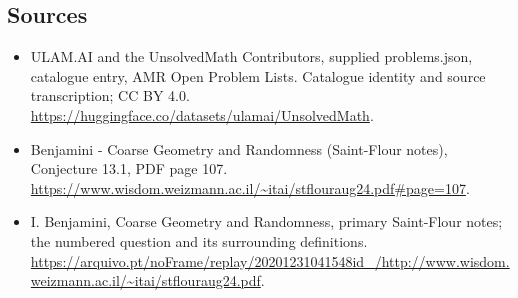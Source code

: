 \documentclass[11pt,a4paper]{article}
\begin{document}
\subsection{Sources}
\begin{itemize}
\item[S1] ULAM.AI and the UnsolvedMath Contributors, supplied problems.json, catalogue entry, AMR Open Problem Lists. Catalogue identity and source transcription; CC BY 4.0.
\url{https://huggingface.co/datasets/ulamai/UnsolvedMath}.
\item[S2] Benjamini - Coarse Geometry and Randomness (Saint-Flour notes), Conjecture 13.1, PDF page 107. 
\url{https://www.wisdom.weizmann.ac.il/~itai/stflouraug24.pdf#page=107}.
\item[S3] I. Benjamini, Coarse Geometry and Randomness, primary Saint-Flour notes; the numbered question and its surrounding definitions.
\url{https://arquivo.pt/noFrame/replay/20201231041548id_/http://www.wisdom.weizmann.ac.il/~itai/stflouraug24.pdf}.
\end{itemize}
\end{document}
